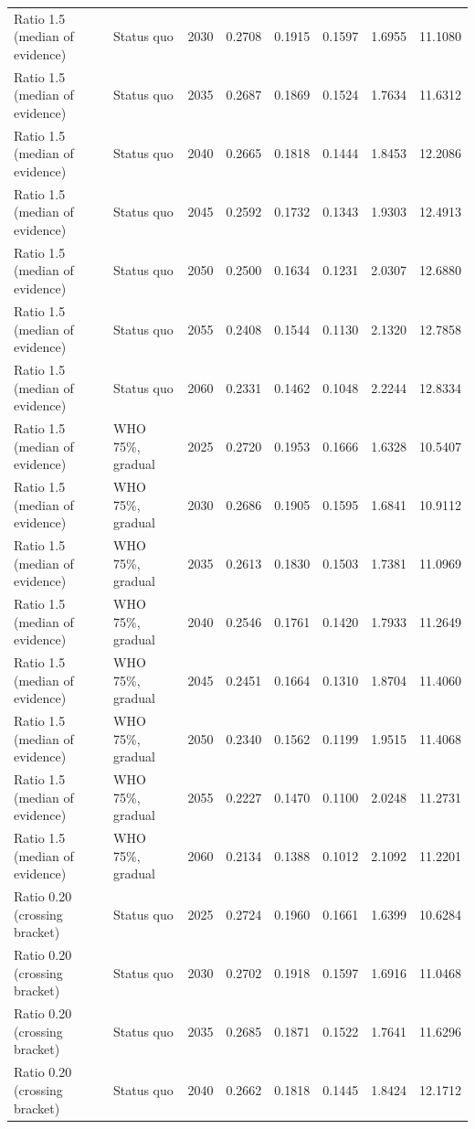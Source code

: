 \begin{longtable}{llrrrrrr}
Ratio 1.5 (median of evidence) & Status quo & 2030 & 0.2708 & 0.1915 & 0.1597 & 1.6955 & 11.1080 \\
Ratio 1.5 (median of evidence) & Status quo & 2035 & 0.2687 & 0.1869 & 0.1524 & 1.7634 & 11.6312 \\
Ratio 1.5 (median of evidence) & Status quo & 2040 & 0.2665 & 0.1818 & 0.1444 & 1.8453 & 12.2086 \\
Ratio 1.5 (median of evidence) & Status quo & 2045 & 0.2592 & 0.1732 & 0.1343 & 1.9303 & 12.4913 \\
Ratio 1.5 (median of evidence) & Status quo & 2050 & 0.2500 & 0.1634 & 0.1231 & 2.0307 & 12.6880 \\
Ratio 1.5 (median of evidence) & Status quo & 2055 & 0.2408 & 0.1544 & 0.1130 & 2.1320 & 12.7858 \\
Ratio 1.5 (median of evidence) & Status quo & 2060 & 0.2331 & 0.1462 & 0.1048 & 2.2244 & 12.8334 \\
Ratio 1.5 (median of evidence) & WHO 75\%, gradual & 2025 & 0.2720 & 0.1953 & 0.1666 & 1.6328 & 10.5407 \\
Ratio 1.5 (median of evidence) & WHO 75\%, gradual & 2030 & 0.2686 & 0.1905 & 0.1595 & 1.6841 & 10.9112 \\
Ratio 1.5 (median of evidence) & WHO 75\%, gradual & 2035 & 0.2613 & 0.1830 & 0.1503 & 1.7381 & 11.0969 \\
Ratio 1.5 (median of evidence) & WHO 75\%, gradual & 2040 & 0.2546 & 0.1761 & 0.1420 & 1.7933 & 11.2649 \\
Ratio 1.5 (median of evidence) & WHO 75\%, gradual & 2045 & 0.2451 & 0.1664 & 0.1310 & 1.8704 & 11.4060 \\
Ratio 1.5 (median of evidence) & WHO 75\%, gradual & 2050 & 0.2340 & 0.1562 & 0.1199 & 1.9515 & 11.4068 \\
Ratio 1.5 (median of evidence) & WHO 75\%, gradual & 2055 & 0.2227 & 0.1470 & 0.1100 & 2.0248 & 11.2731 \\
Ratio 1.5 (median of evidence) & WHO 75\%, gradual & 2060 & 0.2134 & 0.1388 & 0.1012 & 2.1092 & 11.2201 \\
Ratio 0.20 (crossing bracket) & Status quo & 2025 & 0.2724 & 0.1960 & 0.1661 & 1.6399 & 10.6284 \\
Ratio 0.20 (crossing bracket) & Status quo & 2030 & 0.2702 & 0.1918 & 0.1597 & 1.6916 & 11.0468 \\
Ratio 0.20 (crossing bracket) & Status quo & 2035 & 0.2685 & 0.1871 & 0.1522 & 1.7641 & 11.6296 \\
Ratio 0.20 (crossing bracket) & Status quo & 2040 & 0.2662 & 0.1818 & 0.1445 & 1.8424 & 12.1712 \\

\end{longtable}
